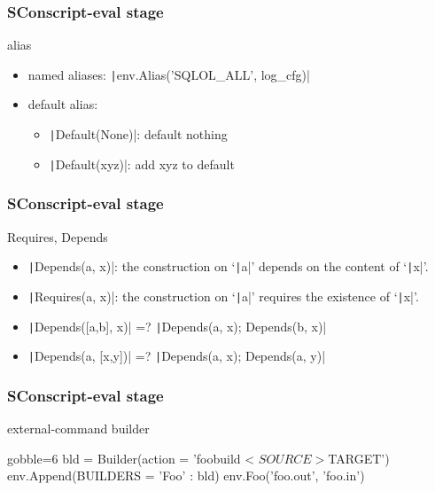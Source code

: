 \documentclass[lualatex]{beamer}
\begin{document}
\begin{frame}[fragile]
  \frametitle{SConscript-eval stage}

  \begin{block}{alias}
    \begin{itemize}
    \item named aliases: \texttt|env.Alias('SQLOL_ALL', log_cfg)|
    \item default alias:
      \begin{itemize}
      \item \texttt|Default(None)|:  default nothing
      \item \texttt|Default(xyz)|: add xyz to default
      \end{itemize}
    \end{itemize}
  \end{block}
\end{frame}

\begin{frame}[fragile]
  \frametitle{SConscript-eval stage}

  \begin{block}{Requires, Depends}
    \begin{itemize}
    \item \texttt|Depends(a, x)|:
      the construction on `\texttt|a|' depends on the content of `\texttt|x|'.
    \item \texttt|Requires(a, x)|:
      the construction on `\texttt|a|' requires the existence of `\texttt|x|'.
    \item<2-> \texttt|Depends([a,b], x)| =? \texttt|Depends(a, x); Depends(b, x)|
    \item<3-> \texttt|Depends(a, [x,y])| =? \texttt|Depends(a, x); Depends(a, y)|
    \end{itemize}
  \end{block}
\end{frame}

\begin{frame}[fragile]
  \frametitle{SConscript-eval stage}

  \begin{block}{external-command builder}
    \begin{py*}{gobble=6}
      bld = Builder(action = 'foobuild < $SOURCE > $TARGET')
      env.Append(BUILDERS = {'Foo' : bld})
      env.Foo('foo.out', 'foo.in')
    \end{py*}
  \end{block}
\end{frame}
\end{document}
